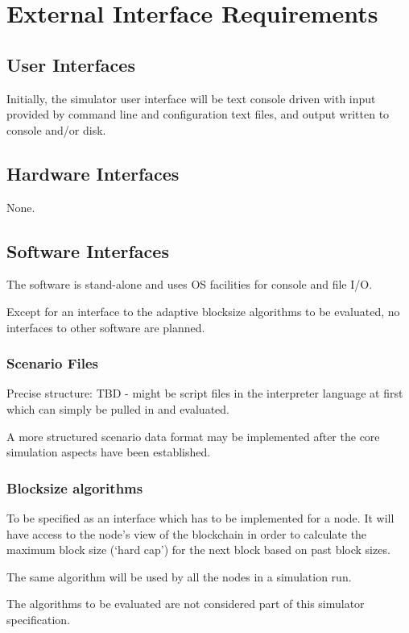 \documentclass{scrreprt}
\begin{document}
\chapter{External Interface Requirements}

\section{User Interfaces}
Initially, the simulator user interface will be text console driven with input
provided by command line and configuration text files, and output written to
console and/or disk.

\section{Hardware Interfaces}
None.

\section{Software Interfaces}
The software is stand-alone and uses OS facilities for console and file I/O.

Except for an interface to the adaptive blocksize algorithms to be evaluated,
no interfaces to other software are planned.

\subsection{Scenario Files}
Precise structure: TBD - might be script files in the interpreter language
at first which can simply be pulled in and evaluated.

A more structured scenario data format may be implemented after the core
simulation aspects have been established.


\subsection{Blocksize algorithms}

To be specified as an interface which has to be implemented for a node.
It will have access to the node's view of the blockchain in order to calculate
the maximum block size (`hard cap') for the next block based on past block sizes.

The same algorithm will be used by all the nodes in a simulation run.

The algorithms to be evaluated are not considered part of this simulator
specification.
\end{document}
